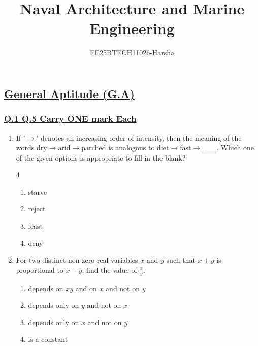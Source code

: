 \documentclass[journal]{IEEEtran}
\theoremstyle{remark}
\begin{document}

\onecolumn

\title{Naval Architecture and Marine Engineering}
\author{EE25BTECH11026-Harsha}
\maketitle

\renewcommand{\thefigure}{\theenumi}
\renewcommand{\thetable}{\theenumi}
\setcounter{secnumdepth}{0}
\subsection{\underline{\textbf{General Aptitude (G.A)}}}
\subsubsection{\underline{Q.1 \text{-} Q.5 Carry ONE mark Each}}
\setlength{\parskip}{1em}


\begin{enumerate}
 \item If '$\rightarrow$' denotes an increasing order of intensity, then the meaning of the words
\(\text{dry} \rightarrow \text{arid} \rightarrow \text{parched}\) 
is analogous to
\(\text{diet} \rightarrow \text{fast} \rightarrow \_\_\_\_\_\_\).
Which one of the given options is appropriate to fill in the blank? \\
\begin{multicols}{4}
\begin{enumerate}[label=\Alph*)]
        \item starve
        \item reject
        \item feast
        \item deny 
\end{enumerate}
\end{multicols}
\end{enumerate}

\begin{enumerate}[itemsep=1em]
\setcounter{enumi}{1}

\item For two distinct non-zero real variables $x$ and $y$ such that $x + y$ is proportional to $x - y$, find the value of $\tfrac{x}{y}$.


\begin{enumerate}[label=\Alph*), leftmargin=2.5em, labelsep=0.5em, itemsep=0.5em]
    \item depends on \(xy\) and on \(x\) and not on \(y\)
    \item depends only on \(y\) and not on \(x\)
    \item depends only on \(x\) and not on \(y\)
    \item is a constant \\
\end{enumerate}

\end{enumerate}
\end{document}
